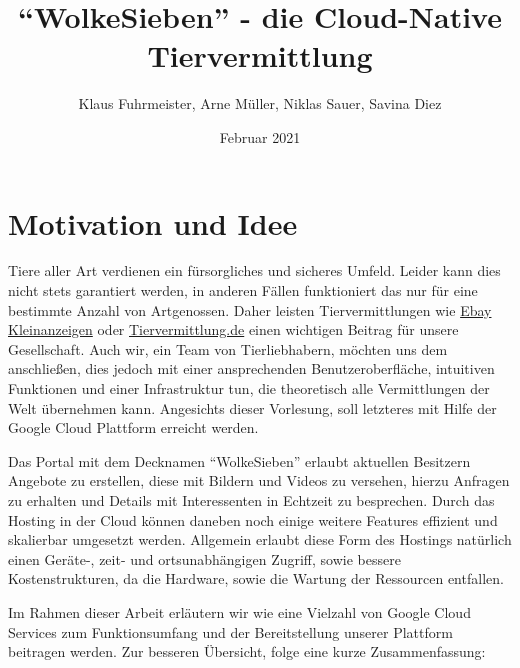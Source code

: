 \documentclass{article}
\title{\enquote{WolkeSieben} - die Cloud-Native Tiervermittlung}
\author{Klaus Fuhrmeister, Arne Müller, Niklas Sauer, Savina Diez}
\date{Februar 2021}
\begin{document}
\maketitle

\section{Motivation und Idee} %

Tiere aller Art verdienen ein fürsorgliches und sicheres Umfeld. Leider kann dies nicht stets garantiert werden, in anderen Fällen funktioniert das nur für eine bestimmte Anzahl von Artgenossen. Daher leisten Tiervermittlungen wie \href{https://www.ebay-kleinanzeigen.de/s-haustiere/c130}{Ebay Kleinanzeigen} oder \href{https://www.tiervermittlung.de}{Tiervermittlung.de}  einen wichtigen Beitrag für unsere Gesellschaft. Auch wir, ein Team von Tierliebhabern, möchten uns dem anschließen, dies jedoch mit einer ansprechenden Benutzeroberfläche, intuitiven Funktionen und einer Infrastruktur tun, die theoretisch alle Vermittlungen der Welt übernehmen kann. Angesichts dieser Vorlesung, soll letzteres mit Hilfe der Google Cloud Plattform erreicht werden. 

Das Portal mit dem Decknamen \enquote{WolkeSieben} erlaubt aktuellen Besitzern Angebote zu erstellen, diese mit Bildern und Videos zu versehen, hierzu Anfragen zu erhalten und Details mit Interessenten in Echtzeit zu besprechen. Durch das Hosting in der Cloud können daneben noch einige weitere Features effizient und skalierbar umgesetzt werden. Allgemein erlaubt diese Form des Hostings natürlich einen Geräte-, zeit- und ortsunabhängigen Zugriff, sowie bessere Kostenstrukturen, da die Hardware, sowie die Wartung der Ressourcen entfallen.

Im Rahmen dieser Arbeit erläutern wir wie eine Vielzahl von Google Cloud Services zum Funktionsumfang und der Bereitstellung unserer Plattform beitragen werden. Zur besseren Übersicht, folge eine kurze Zusammenfassung:
\end{document}
